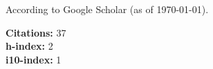 \newif\ifshowpubsummary
\showpubsummarytrue %

\newif\ifshowsubmittedpubs

\newif\ifshowacceptedpubs

\nocite{*}
\ifshowpubsummary
{}
   \begin{minipage}[t]{0.6\textwidth}
      According to Google Scholar (as of \today).
   \end{minipage}%
   \begin{minipage}[t]{0.4\textwidth}
      \begin{flushright}
         \textbf{Citations:} 37\\
         \textbf{h-index:} 2\\
         \textbf{i10-index:} 1
      \end{flushright}
   \end{minipage}

\else %
\fi

\ifshowsubmittedpubs
\subsectiontitle{Submitted Publications}
\printbibliography[keyword=submitted, heading=none]
\else %
\fi

\ifshowacceptedpubs
\subsectiontitle{Accepted Publications}
\printbibliography[keyword=accepted, heading=none]
\else %
\fi

\printbibliography[keyword=refereed, heading=none]
